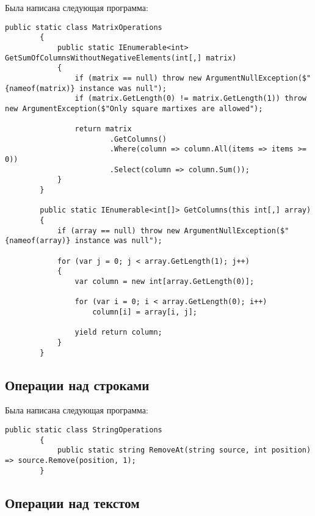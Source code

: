 \documentclass[a4paper,14pt]{extarticle}
\begin{document}
    Была написана следующая программа:

    \begin{lstlisting}[language={[Sharp]C}]
        public static class MatrixOperations
        {
            public static IEnumerable<int> GetSumOfColumnsWithoutNegativeElements(int[,] matrix)
            {
                if (matrix == null) throw new ArgumentNullException($"{nameof(matrix)} instance was null");
                if (matrix.GetLength(0) != matrix.GetLength(1)) throw new ArgumentException($"Only square martixes are allowed");

                return matrix
                        .GetColumns()
                        .Where(column => column.All(items => items >= 0))
                        .Select(column => column.Sum());
            }
        }

        public static IEnumerable<int[]> GetColumns(this int[,] array)
        {
            if (array == null) throw new ArgumentNullException($"{nameof(array)} instance was null");

            for (var j = 0; j < array.GetLength(1); j++)
            {
                var column = new int[array.GetLength(0)];

                for (var i = 0; i < array.GetLength(0); i++)
                    column[i] = array[i, j];

                yield return column;
            }
        }
    \end{lstlisting}

    \subsection{Операции над строками}

    Была написана следующая программа:

    \begin{lstlisting}[language={[Sharp]C}]
        public static class StringOperations
        {
            public static string RemoveAt(string source, int position) => source.Remove(position, 1);
        }
    \end{lstlisting}

    \subsection{Операции над текстом}
\end{document}

